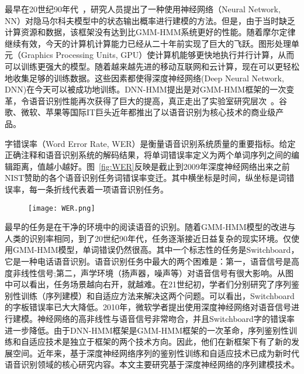 最早在20世纪90年代~\cite{bourlard1989continuous,bourlard1992cdnn,bourlard2012connectionist}，研究人员提出了一种使用神经网络（Neural Network, NN）对隐马尔科夫模型中的状态输出概率进行建模的方法。但是，由于当时缺乏计算资源和数据，该框架没有达到比GMM-HMM系统更好的性能。随着摩尔定律继续有效，今天的计算机计算能力已经从二十年前实现了巨大的飞跃。图形处理单元（Graphics Processing Units, GPU）使计算机能够更快地执行并行计算，从而可以训练更强大的模型。随着越来越先进的移动互联网和云计算，现在可以更轻松地收集足够的训练数据。这些因素都使得深度神经网络(Deep Neural Network, DNN)在今天可以被成功地训练。DNN-HMM提出是对GMM-HMM框架的一次变革，令语音识别性能再次获得了巨大的提高，真正走出了实验室研究层次~\cite{ASRBook-Yu2014,CD-DNN-HMM-dahl2012,DNN4ASR-hinton2012,qian2016very,TDNN-peddinti2015,Deepspeech2-amodei2015,LACE-yu2016,xiong2017microsoft}。谷歌、微软、苹果等国际IT巨头近年都推出了以语音识别为核心技术的商业级产品。


字错误率（Word Error Rate, WER）是衡量语音识别系统质量的重要指标。给定正确注释和语音识别系统的解码结果，将单词错误率定义为两个单词序列之间的编辑距离，值越小越好。图~\ref{fig:WER}反映是截止到2009年深度神经网络出来之前NIST赞助的各个语音识别任务词错误率变迁。其中横坐标是时间，纵坐标是词错误率，每一条折线代表着一项语音识别任务。
\begin{figure}[ht]
  \centering
    \captionstyle{\centering}
    \centering
    \texttt{[image: WER.png]}
\end{figure}

最早的任务是在干净的环境中的阅读语音的识别。随着GMM-HMM模型的改进与人类的识别率相同，到了20世纪90年代，任务逐渐接近日益复杂的现实环境。仅使用GMM-HMM模型，单词错误仍然很高。其中一个标志性的任务是Switchboard，它是一种电话语音识别。语音识别任务中最大的两个困难是：第一，语音信号是高度非线性信号;第二，声学环境（扬声器，噪声等）对语音信号有很大影响。从图中可以看出，任务场景越向右开，就越难。在21世纪初，学者们分别研究了序列鉴别性训练（序列建模）和自适应方法来解决这两个问题。可以看出，Switchboard的字板错误率已大大降低。2010年，微软学者提出使用深度神经网络对语音信号进行建模。神经网络的高非线性与语音信号非常吻合，并且Switchboard字的错误率进一步降低。由于DNN-HMM框架是GMM-HMM框架的一次革命，序列鉴别性训练和自适应技术是独立于框架的两个技术方向。因此，他们在新框架下有了新的发展空间。近年来，基于深度神经网络序列的鉴别性训练和自适应技术已成为新时代语音识别领域的核心研究内容。本文主要研究基于深度神经网络的序列建模技术。

